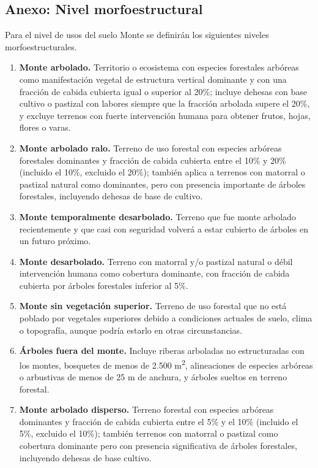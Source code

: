 \subsection{Anexo: Nivel morfoestructural}\label{sec:nivel2}
Para el nivel de usos del suelo Monte se definirán los siguientes niveles morfoestructurales.

\begin{enumerate}
    \item \textbf{Monte arbolado.} Territorio o ecosistema con especies forestales arbóreas como manifestación vegetal de estructura vertical dominante y con una fracción de cabida cubierta igual o superior al 20\%; incluye dehesas con base cultivo o pastizal con labores siempre que la fracción arbolada supere el 20\%, y excluye terrenos con fuerte intervención humana para obtener frutos, hojas, flores o varas.
    
    \item \textbf{Monte arbolado ralo.} Terreno de uso forestal con especies arbóreas forestales dominantes y fracción de cabida cubierta entre el 10\% y 20\% (incluido el 10\%, excluido el 20\%); también aplica a terrenos con matorral o pastizal natural como dominantes, pero con presencia importante de árboles forestales, incluyendo dehesas de base de cultivo.
    
    \item \textbf{Monte temporalmente desarbolado.} Terreno que fue monte arbolado recientemente y que casi con seguridad volverá a estar cubierto de árboles en un futuro próximo.
    
    \item \textbf{Monte desarbolado.} Terreno con matorral y/o pastizal natural o débil intervención humana como cobertura dominante, con fracción de cabida cubierta por árboles forestales inferior al 5\%.
    
    \item \textbf{Monte sin vegetación superior.} Terreno de uso forestal que no está poblado por vegetales superiores debido a condiciones actuales de suelo, clima o topografía, aunque podría estarlo en otras circunstancias.
    
    \item \textbf{Árboles fuera del monte.} Incluye riberas arboladas no estructuradas con los montes, bosquetes de menos de 2.500 m\textsuperscript{2}, alineaciones de especies arbóreas o arbustivas de menos de 25 m de anchura, y árboles sueltos en terreno forestal.
    
    \item \textbf{Monte arbolado disperso.} Terreno forestal con especies arbóreas dominantes y fracción de cabida cubierta entre el 5\% y el 10\% (incluido el 5\%, excluido el 10\%); también terrenos con matorral o pastizal como cobertura dominante pero con presencia significativa de árboles forestales, incluyendo dehesas de base cultivo.
\end{enumerate}

